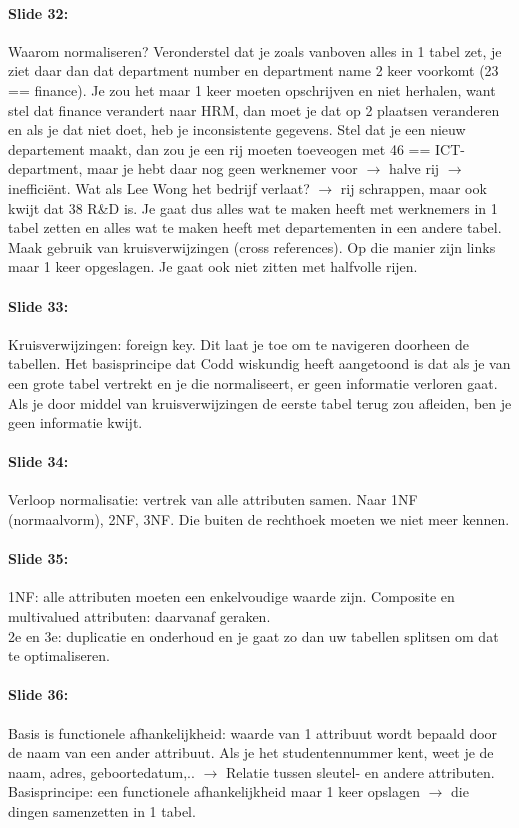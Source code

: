 \documentclass[10pt,a4paper]{report}
\begin{document}
\paragraph{Slide 32:}Waarom normaliseren? Veronderstel dat je zoals vanboven alles in 1 tabel zet, je ziet daar dan dat department number en department name 2 keer voorkomt (23 == finance). Je zou het maar 1 keer moeten opschrijven en niet herhalen, want stel dat finance verandert naar HRM, dan moet je dat op 2 plaatsen veranderen en als je dat niet doet, heb je inconsistente gegevens. Stel dat je een nieuw departement maakt, dan zou je een rij moeten toeveogen met 46 == ICT-department, maar je hebt daar nog geen werknemer voor $\rightarrow$ halve rij $\rightarrow$ inefficiënt. Wat als Lee Wong het bedrijf verlaat? $\rightarrow$ rij schrappen, maar ook kwijt dat 38 R\&D is.
Je gaat dus alles wat te maken heeft met werknemers in 1 tabel zetten en alles wat te maken heeft met departementen in een andere tabel. Maak gebruik van kruisverwijzingen (cross references). Op die manier zijn links maar 1 keer opgeslagen. Je gaat ook niet zitten met halfvolle rijen.

\paragraph{Slide 33:}Kruisverwijzingen: foreign key. Dit laat je toe om te navigeren doorheen de tabellen. Het basisprincipe dat Codd wiskundig heeft aangetoond is dat als je van een grote tabel vertrekt en je die normaliseert, er geen informatie verloren gaat. Als je door middel van kruisverwijzingen de eerste tabel terug zou afleiden, ben je geen informatie kwijt.

\paragraph{Slide 34:}Verloop normalisatie: vertrek van alle attributen samen. Naar 1NF (normaalvorm), 2NF, 3NF. Die buiten de rechthoek moeten we niet meer kennen.

\paragraph{Slide 35:}1NF: alle attributen moeten een enkelvoudige waarde zijn. Composite en multivalued attributen: daarvanaf geraken.\\
2e en 3e: duplicatie en onderhoud en je gaat zo dan uw tabellen splitsen om dat te optimaliseren.

\paragraph{Slide 36:}Basis is functionele afhankelijkheid: waarde van 1 attribuut wordt bepaald door de naam van een ander attribuut. Als je het studentennummer kent, weet je de naam, adres, geboortedatum,..  $\rightarrow$ Relatie tussen sleutel- en andere attributen.
Basisprincipe: een functionele afhankelijkheid maar 1 keer opslagen $\rightarrow$ die dingen samenzetten in 1 tabel.
\end{document}
